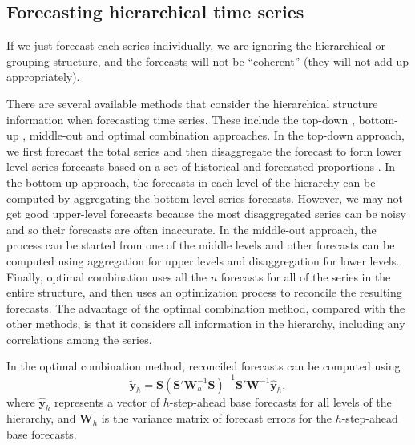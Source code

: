 \documentclass[11pt,a4paper,]{article}
\begin{document}
\hypertarget{forecasting-hierarchical-time-series}{%
\subsection{Forecasting hierarchical time series}\label{forecasting-hierarchical-time-series}}

If we just forecast each series individually, we are ignoring the hierarchical or grouping structure, and the forecasts will not be ``coherent'' (they will not add up appropriately).

There are several available methods that consider the hierarchical structure information when forecasting time series. These include the top-down \autocites{gross1990disaggregation}{fliedner2001hierarchical}, bottom-up \autocite{kahn1998revisiting}, middle-out and optimal combination \autocite{hyndman2011optimal} approaches. In the top-down approach, we first forecast the total series and then disaggregate the forecast to form lower level series forecasts based on a set of historical and forecasted proportions \autocite[for details see][]{athanasopoulos2009hierarchical}. In the bottom-up approach, the forecasts in each level of the hierarchy can be computed by aggregating the bottom level series forecasts. However, we may not get good upper-level forecasts because the most disaggregated series can be noisy and so their forecasts are often inaccurate. In the middle-out approach, the process can be started from one of the middle levels and other forecasts can be computed using aggregation for upper levels and disaggregation for lower levels. Finally, optimal combination uses all the \(n\) forecasts for all of the series in the entire structure, and then uses an optimization process to reconcile the resulting forecasts. The advantage of the optimal combination method, compared with the other methods, is that it considers all information in the hierarchy, including any correlations among the series.

In the optimal combination method, reconciled forecasts can be computed using \autocite{mint2018}
\begin{equation}\label{eq:mint}
  \tilde{\bm{y}}_{h}=\bm{S}(\bm{S}'\bm{W}_h^{-1}\bm{S})^{-1}\bm{S}'\bm{W}^{-1}\hat{\bm{y}}_h,
\end{equation}
where \(\hat{\bm{y}}_h\) represents a vector of \(h\)-step-ahead base forecasts for all levels of the hierarchy, and \(\bm{W}_h\) is the variance matrix of forecast errors for the \(h\)-step-ahead base forecasts.
\end{document}

